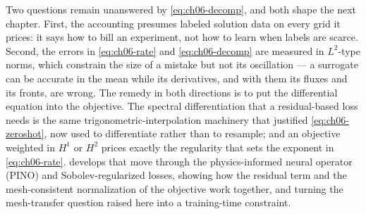 
Two questions remain unanswered by \eqref{eq:ch06-decomp}, and both shape the
next chapter. First, the accounting presumes labeled solution data on every grid
it prices: it says how to bill an experiment, not how to learn when labels are
scarce. Second, the errors in \eqref{eq:ch06-rate} and
\eqref{eq:ch06-decomp} are measured in $L^2$-type norms, which constrain the
size of a mistake but not its oscillation --- a surrogate can be accurate in the
mean while its derivatives, and with them its fluxes and its fronts, are wrong.
The remedy in both directions is to put the differential equation into the
objective. The spectral
differentiation that a residual-based loss needs is the same
trigonometric-interpolation machinery that justified \eqref{eq:ch06-zeroshot},
now used to differentiate rather than to resample; and an objective weighted in
$H^1$ or $H^2$ prices exactly the regularity that sets the exponent in
\eqref{eq:ch06-rate}. 
develops that move through the physics-informed neural operator
(PINO) \cite{li2021physics} and Sobolev-regularized losses, showing how the
residual term and the mesh-consistent normalization of the objective work
together, and turning the mesh-transfer question raised here into a
training-time constraint.
